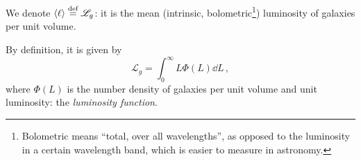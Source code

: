 \documentclass[main.tex]{subfiles}
\begin{document}
We denote \( \expval{\ell} \stackrel{\text{def}}{=} \mathscr L_g  \): it is the mean (intrinsic, bolometric\footnote{Bolometric means ``total, over all wavelengths'', as opposed to the luminosity in a certain wavelength band, which is easier to measure in astronomy.}) luminosity of galaxies per unit volume.

By definition, it is given by 
%
\begin{equation}
  \mathscr L _g = \int_0^\infty  L \Phi(L) \dd{L}
\,,
\end{equation}
%
where \(\Phi(L)\) is the number density of galaxies per unit volume and unit luminosity: the \emph{luminosity function}.
\end{document}
